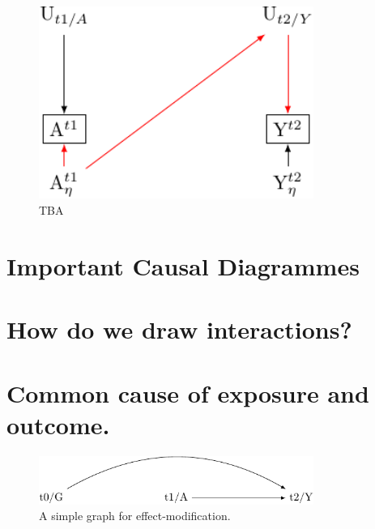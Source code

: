 \documentclass[
  singlecolumn]{report}
\begin{document}
\begin{figure}

{\centering \includegraphics[width=0.8\textwidth,height=\textheight]{causal-dags_files/figure-pdf/fig-directed-measurement-error-1.pdf}

}

\caption{\label{fig-directed-measurement-error}TBA}

\end{figure}

\hypertarget{important-causal-diagrammes}{%
\section{Important Causal
Diagrammes}\label{important-causal-diagrammes}}

\hypertarget{how-do-we-draw-interactions}{%
\section{How do we draw
interactions?}\label{how-do-we-draw-interactions}}

\hypertarget{common-cause-of-exposure-and-outcome.}{%
\section{Common cause of exposure and
outcome.}\label{common-cause-of-exposure-and-outcome.}}

\begin{figure}

{\centering \includegraphics[width=0.8\textwidth,height=\textheight]{causal-dags_files/figure-pdf/fig-dag-effect-modfication-1.pdf}

}

\caption{\label{fig-dag-effect-modfication}A simple graph for
effect-modification.}

\end{figure}
\end{document}
